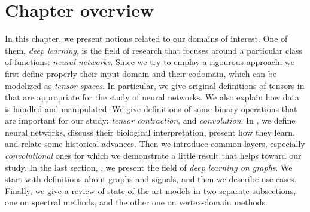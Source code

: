 \section*{Chapter overview}

In this chapter, we present notions related to our domains of interest. One of them, \emph{deep learning}, is the field of research that focuses around a particular class of functions: \emph{neural networks}. Since we try to employ a rigourous approach, we first define properly their input domain and their codomain, which can be modelized as \emph{tensor spaces}. In particular, we give original definitions of tensors in  that are appropriate for the study of neural networks. We also explain how data is handled and manipulated. We give definitions of some binary operations that are important for our study: \emph{tensor contraction}, and \emph{convolution}. In , we define neural networks, discuss their biological interpretation, present how they learn, and relate some historical advances. Then we introduce common layers, especially \emph{convolutional} ones for which we demonstrate a little result that helps toward our study. In the last section, , we present the field of \emph{deep learning on graphs}. We start with definitions about graphs and signals, and then we describe use cases. Finally, we give a review of state-of-the-art models in two separate subsections, one on spectral methods, and the other one on vertex-domain methods.